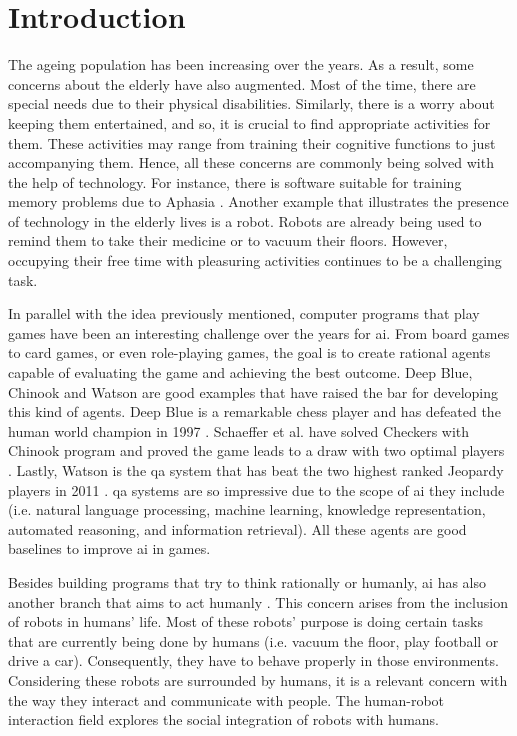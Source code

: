 \section{Introduction} \label{introduction}

The ageing population has been increasing over the years.
As a result, some concerns about the elderly have also augmented.
Most of the time, there are special needs due to their physical disabilities.
Similarly, there is a worry about keeping them entertained, and so, it is crucial to find appropriate activities for them.
These activities may range from training their cognitive functions to just accompanying them.
Hence, all these concerns are commonly being solved with the help of technology.
For instance, there is software suitable for training memory problems due to Aphasia \cite{Pompili2011}.
Another example that illustrates the presence of technology in the elderly lives is a robot.
Robots are already being used to remind them to take their medicine or to vacuum their floors.
However, occupying their free time with pleasuring activities continues to be a challenging task.


In parallel with the idea previously mentioned, computer programs that play games have been an interesting challenge over the years for \gls{ai}.
From board games to card games, or even role-playing games, the goal is to create rational agents capable of evaluating the game and achieving the best outcome.
Deep Blue, Chinook and Watson are good examples that have raised the bar for developing this kind of agents.
Deep Blue is a remarkable chess player and has defeated the human world champion in 1997 \cite{Campbell2002}.
Schaeffer et al. have solved Checkers with Chinook program and proved the game leads to a draw with two optimal players \cite{Schaeffer1996}.
Lastly, Watson is the \gls{qa} system that has beat the two highest ranked Jeopardy players in 2011 \cite{Ferrucci2010}.
\gls{qa} systems are so impressive due to the scope of \gls{ai} they include (i.e. natural language processing, machine learning, knowledge representation, automated reasoning, and information retrieval).
All these agents are good baselines to improve \gls{ai} in games.


Besides building programs that try to think rationally or humanly, \gls{ai} has also another branch that aims to act humanly \cite{Russell2009}.
This concern arises from the inclusion of robots in humans' life.
Most of these robots' purpose is doing certain tasks that are currently being done by humans (i.e. vacuum the floor, play football or drive a car).
Consequently, they have to behave properly in those environments.
Considering these robots are surrounded by humans, it is a relevant concern with the way they interact and communicate with people.
The human-robot interaction field explores the social integration of robots with humans.



